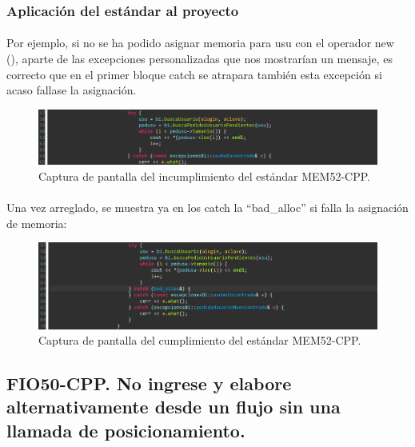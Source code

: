 		\subsubsection{Aplicación del estándar al proyecto}

			\paragraph{}Por ejemplo, si no se ha podido asignar memoria para usu con el operador new (), aparte de las excepciones personalizadas que nos mostrarían un mensaje, es correcto que en el primer bloque catch se atrapara también esta excepción si acaso fallase la asignación.
			
			\begin{figure}[H]
				\centering
				\includegraphics[scale=0.8]{img/img5.png}
				\caption{Captura de pantalla del incumplimiento del estándar MEM52-CPP.}
				\label{img5}
			\end{figure}
			
			\paragraph{}Una vez arreglado, se muestra ya en los catch la “bad\_alloc” si falla la asignación de memoria:
			
			\begin{figure}[H]
				\centering
				\includegraphics[scale=0.8]{img/img6.png}
				\caption{Captura de pantalla del cumplimiento del estándar MEM52-CPP.}
				\label{img6}
			\end{figure}
		
	\subsection{FIO50-CPP. No ingrese y elabore alternativamente desde un flujo sin una llamada de posicionamiento.}
	
